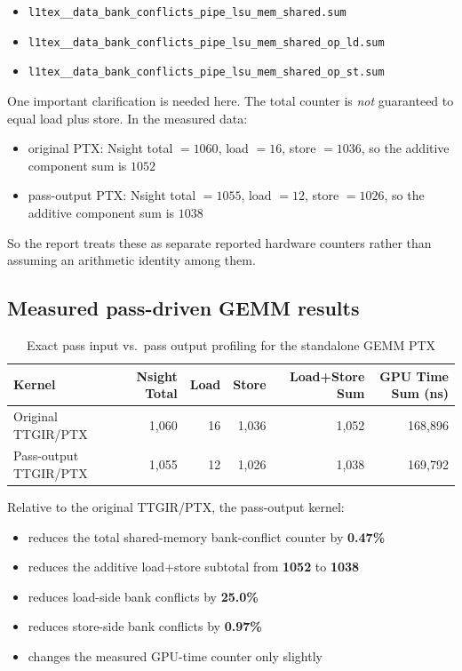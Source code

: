 \documentclass[11pt,a4paper]{article}
\begin{document}
\begin{itemize}
\item \texttt{l1tex\_\_data\_bank\_conflicts\_pipe\_lsu\_mem\_shared.sum}
\item \texttt{l1tex\_\_data\_bank\_conflicts\_pipe\_lsu\_mem\_shared\_op\_ld.sum}
\item \texttt{l1tex\_\_data\_bank\_conflicts\_pipe\_lsu\_mem\_shared\_op\_st.sum}
\end{itemize}

One important clarification is needed here.  The total counter is \emph{not}
guaranteed to equal load plus store.  In the measured data:

\begin{itemize}
\item original PTX: Nsight total \(= 1060\), load \(= 16\),
      store \(= 1036\), so the additive component sum is \(1052\)
\item pass-output PTX: Nsight total \(= 1055\), load \(= 12\),
      store \(= 1026\), so the additive component sum is \(1038\)
\end{itemize}

So the report treats these as separate reported hardware counters rather than
assuming an arithmetic identity among them.

\subsection{Measured pass-driven GEMM results}

\begin{table}[H]
\centering
\caption{Exact pass input vs.\ pass output profiling for the standalone GEMM PTX}
\begin{tabular}{lrrrrr}
\toprule
Kernel & Nsight Total & Load & Store & Load+Store Sum & GPU Time Sum (ns) \\
\midrule
Original TTGIR/PTX & 1,060 & 16 & 1,036 & 1,052 & 168,896 \\
Pass-output TTGIR/PTX & 1,055 & 12 & 1,026 & 1,038 & 169,792 \\
\bottomrule
\end{tabular}
\end{table}

Relative to the original TTGIR/PTX, the pass-output kernel:

\begin{itemize}
\item reduces the total shared-memory bank-conflict counter by
      \textbf{0.47\%}
\item reduces the additive load+store subtotal from \textbf{1052} to
      \textbf{1038}
\item reduces load-side bank conflicts by \textbf{25.0\%}
\item reduces store-side bank conflicts by \textbf{0.97\%}
\item changes the measured GPU-time counter only slightly
\end{itemize}
\end{document}
